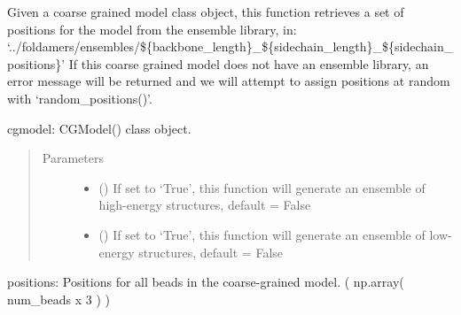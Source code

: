 \documentclass[letterpaper,12pt,english,openany,oneside]{sphinxmanual}
\begin{document}
\begin{fulllineitems}
\label{\detokenize{utilities:utilities.util.get_structure_from_library}}
Given a coarse grained model class object, this function retrieves
a set of positions for the model from the ensemble library, in:
‘../foldamers/ensembles/\$\{backbone\_length\}\_\$\{sidechain\_length\}\_\$\{sidechain\_positions\}’
If this coarse grained model does not have an ensemble library, an 
error message will be returned and we will attempt to assign 
positions at random with ‘random\_positions()’.

cgmodel: CGModel() class object.
\begin{quote}\begin{description}
\item[{Parameters}] \leavevmode\begin{itemize}
\item {} 
 () \textendash{} If set to ‘True’, this function will generate an ensemble of high-energy structures, default = False

\item {} 
 () \textendash{} If set to ‘True’, this function will generate an ensemble of low-energy structures, default = False

\end{itemize}

\end{description}\end{quote}

positions: Positions for all beads in the coarse-grained model.
( np.array( num\_beads x 3 ) )

\end{fulllineitems}

\end{document}
